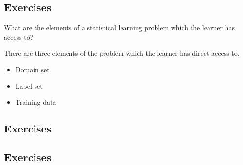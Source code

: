 \subsection{Exercises \basic}
\begin{exercise}
	\begin{problem}
	What are the elements of a statistical learning problem which the learner has access to?
	\end{problem}
	\begin{solution}
		There are three elements of the problem which the learner has direct access to,
		\begin{itemize}
			\item Domain set
			\item Label set
			\item Training data
		\end{itemize}
	\end{solution}
\end{exercise}

\subsection{Exercises \intermediate}
\subsection{Exercises \challenging}

